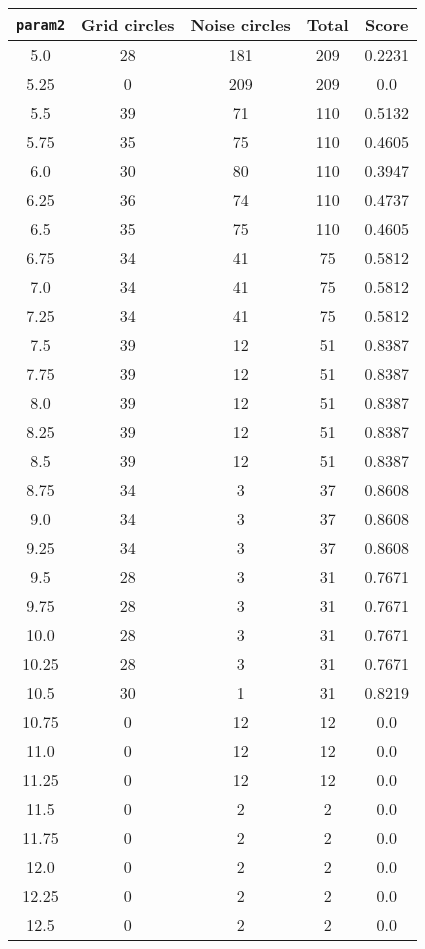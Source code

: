 \documentclass[letterpaper, 12pt]{article}
\begin{document}
\begin{longtable}{|c|c|c|c|c|}
\hline
\textbf{\texttt{param2}} & \textbf{Grid circles} & \textbf{Noise circles} & \textbf{Total} & \textbf{Score} \\
\hline
5.0 & 28 & 181 & 209 & 0.2231 \\
\hline
5.25 & 0 & 209 & 209 & 0.0 \\
\hline
5.5 & 39 & 71 & 110 & 0.5132 \\
\hline
5.75 & 35 & 75 & 110 & 0.4605 \\
\hline
6.0 & 30 & 80 & 110 & 0.3947 \\
\hline
6.25 & 36 & 74 & 110 & 0.4737 \\
\hline
6.5 & 35 & 75 & 110 & 0.4605 \\
\hline
6.75 & 34 & 41 & 75 & 0.5812 \\
\hline
7.0 & 34 & 41 & 75 & 0.5812 \\
\hline
7.25 & 34 & 41 & 75 & 0.5812 \\
\hline
7.5 & 39 & 12 & 51 & 0.8387 \\
\hline
7.75 & 39 & 12 & 51 & 0.8387 \\
\hline
8.0 & 39 & 12 & 51 & 0.8387 \\
\hline
8.25 & 39 & 12 & 51 & 0.8387 \\
\hline
8.5 & 39 & 12 & 51 & 0.8387 \\
\hline
8.75 & 34 & 3 & 37 & 0.8608 \\
\hline
9.0 & 34 & 3 & 37 & 0.8608 \\
\hline
9.25 & 34 & 3 & 37 & 0.8608 \\
\hline
9.5 & 28 & 3 & 31 & 0.7671 \\
\hline
9.75 & 28 & 3 & 31 & 0.7671 \\
\hline
10.0 & 28 & 3 & 31 & 0.7671 \\
\hline
10.25 & 28 & 3 & 31 & 0.7671 \\
\hline
10.5 & 30 & 1 & 31 & 0.8219 \\
\hline
10.75 & 0 & 12 & 12 & 0.0 \\
\hline
11.0 & 0 & 12 & 12 & 0.0 \\
\hline
11.25 & 0 & 12 & 12 & 0.0 \\
\hline
11.5 & 0 & 2 & 2 & 0.0 \\
\hline
11.75 & 0 & 2 & 2 & 0.0 \\
\hline
12.0 & 0 & 2 & 2 & 0.0 \\
\hline
12.25 & 0 & 2 & 2 & 0.0 \\
\hline
12.5 & 0 & 2 & 2 & 0.0 \\

\end{longtable}
\end{document}
